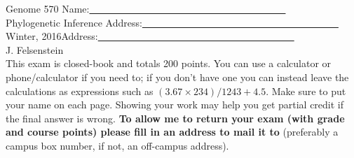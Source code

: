 \documentclass[12pt]{article}
\begin{document}
\noindent
Genome 570 \hfill Name:\underline{~~~~~~~~~~~~~~~~~~~~~~~~~~~~~~~~~~~~~~~~}\\
Phylogenetic Inference     \hfill Address:\underline{~~~~~~~~~~~~~~~~~~~~~~~~~~~~~~~~~~~~~~~~}\\
Winter, 2016\hfill Address:\underline{~~~~~~~~~~~~~~~~~~~~~~~~~~~~~~~~~~~~~~~~}\\
J. Felsenstein \hfill ~~ \\

\noindent
This exam is closed-book and totals 200 points.  You can use a calculator
or phone/calculator if you need to; if you don't have one you can instead leave the calculations
as expressions such as $(3.67 \times 234) / 1243 + 4.5$.  Make sure to put
your name on each page.  Showing your work may help you get partial
credit if the final answer is wrong.  {\bf To allow me to return your
exam (with grade and course points) please fill in an address to mail
it to} (preferably a campus box number, if not, an off-campus address).
\medskip
\end{document}
